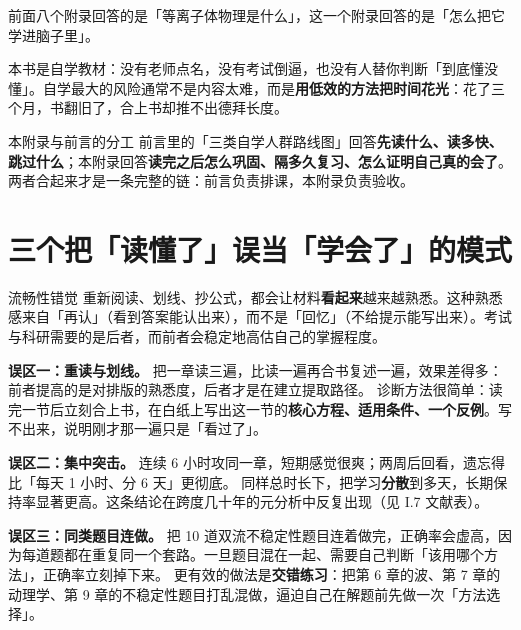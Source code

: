 
前面八个附录回答的是「等离子体物理是什么」，这一个附录回答的是「怎么把它学进脑子里」。

本书是自学教材：没有老师点名，没有考试倒逼，也没有人替你判断「到底懂没懂」。自学最大的风险通常不是内容太难，而是\textbf{用低效的方法把时间花光}：花了三个月，书翻旧了，合上书却推不出德拜长度。

\begin{insight}{本附录与前言的分工}{}
前言里的「三类自学人群路线图」回答\textbf{先读什么、读多快、跳过什么}；本附录回答\textbf{读完之后怎么巩固、隔多久复习、怎么证明自己真的会了}。两者合起来才是一条完整的链：前言负责排课，本附录负责验收。
\end{insight}


\section{三个把「读懂了」误当「学会了」的模式}

\begin{warning}{流畅性错觉}{}
重新阅读、划线、抄公式，都会让材料\textbf{看起来}越来越熟悉。这种熟悉感来自「再认」（看到答案能认出来），而不是「回忆」（不给提示能写出来）。考试与科研需要的是后者，而前者会稳定地高估自己的掌握程度。
\end{warning}

\textbf{误区一：重读与划线。}
把一章读三遍，比读一遍再合书复述一遍，效果差得多：前者提高的是对排版的熟悉度，后者才是在建立提取路径。
诊断方法很简单：读完一节后立刻合上书，在白纸上写出这一节的\textbf{核心方程、适用条件、一个反例}。写不出来，说明刚才那一遍只是「看过了」。

\textbf{误区二：集中突击。}
连续 6 小时攻同一章，短期感觉很爽；两周后回看，遗忘得比「每天 1 小时、分 6 天」更彻底。
同样总时长下，把学习\textbf{分散}到多天，长期保持率显著更高。这条结论在跨度几十年的元分析中反复出现（见 I.7 文献表）。

\textbf{误区三：同类题目连做。}
把 10 道双流不稳定性题目连着做完，正确率会虚高，因为每道题都在重复同一个套路。一旦题目混在一起、需要自己判断「该用哪个方法」，正确率立刻掉下来。
更有效的做法是\textbf{交错练习}：把第 6 章的波、第 7 章的动理学、第 9 章的不稳定性题目打乱混做，逼迫自己在解题前先做一次「方法选择」。

